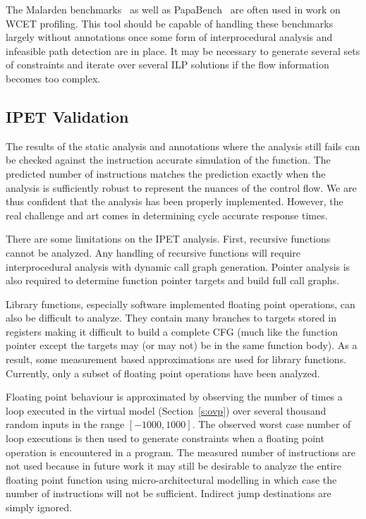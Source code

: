 The Malarden benchmarks~\cite{gustafsson2010malardalen} as well as PapaBench~\cite{nemer2006papabench} are often used in work on WCET profiling. This tool should be capable of handling these benchmarks largely without annotations once some form of interprocedural analysis and infeasible path detection are in place. It may be necessary to generate several sets of constraints and iterate over several ILP solutions if the flow information becomes too complex. 




\subsection{IPET Validation}

The results of the static analysis and annotations where the analysis still fails can be checked against the instruction accurate simulation of the function. The predicted number of instructions matches the prediction exactly when the analysis is sufficiently robust to represent the nuances of the control flow. We are thus confident that the analysis has been properly implemented. However, the real challenge and art comes in determining cycle accurate response times.

There are some limitations on the IPET analysis. First, recursive functions cannot be analyzed. Any handling of recursive functions will require interprocedural analysis with dynamic call graph generation. Pointer analysis is also required to determine function pointer targets and build full call graphs. 



Library functions, especially software implemented floating point operations, can also be difficult to analyze. They contain many branches to targets stored in registers making it difficult to build a complete CFG (much like the function pointer except the targets may (or may not) be in the same function body). As a result, some measurement based approximations are used for library functions. Currently, only a subset of floating point operations have been analyzed.


Floating point behaviour is approximated by observing the number of times a loop executed in the virtual model (Section~\ref{s:ovp}) over several thousand random inputs in the range $[-1000,1000]$. The observed worst case number of loop executions is then used to generate constraints when a floating point operation is encountered in a program. The measured number of instructions are not used because in future work it may still be desirable to analyze the entire floating point function using micro-architectural modelling in which case the number of instructions will not be sufficient. Indirect jump destinations are simply ignored. 


